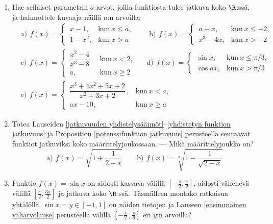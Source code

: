 \begin{enumerate}
\item
Hae sellaiset parametrin $a$ arvot, joilla funktiosta tulee jatkuva koko $\R$:ssä, ja
hahmottele kuvaaja näillä $a$:n arvoilla:
\begin{align*}
&\text{a)}\,\ f(x)=\begin{cases}
                   \,x-1, &\text{kun}\ x \le a, \\ \,1-x^2, &\text{kun}\ x>a
                   \end{cases} \qquad
 \text{b)}\,\ f(x)=\begin{cases}
                   \,a-x, &\text{kun}\ x \le -2, \\ \,x^3-4x, &\text{kun}\ x>-2
                   \end{cases} \\
&\text{c)}\,\ f(x)=\begin{cases}
                   \,\dfrac{x^2-4}{x^3-8}\,, &\text{kun}\ x<2, \\[2mm]\,a,&\text{kun}\ x \ge 2
                   \end{cases} \quad\ \
 \text{d)}\,\ f(x)=\begin{cases}
                   \,\sin x, &\text{kun}\ x \le \pi/3, \\ \,\cos ax, &\text{kun}\ x>\pi/3
                   \end{cases} \\
&\text{e)}\,\ f(x)=\begin{cases}
                   \,\dfrac{x^3+4x^2+5x+2}{x^2+3x+2}\,, &\text{kun}\ x<a, \\[2mm] 
                   \,ax-10,                             &\text{kun}\ x \ge a
                   \end{cases}
\end{align*}

\item
Totea Lauseiden \ref{jatkuvuuden yhdistelysäännöt}--\ref{yhdistetyn funktion jatkuvuus} ja 
Proposition \ref{potenssifunktion jatkuvuus} perusteella seuraavat funktiot jatkuviksi koko 
määrittelyjoukossaan. --- Mikä määrittelyjoukko on?
\[
\text{a)}\,\ f(x)=\sqrt{1+\frac{1}{2-x}} \qquad 
\text{b)}\,\ f(x)=\sqrt[4]{1-\frac{1}{\sqrt{2-x}}}
\]

\item
Funktio $f(x)=\sin x$ on aidosti kasvava välillä $[-\frac{\pi}{2},\frac{\pi}{2}]$, aidosti
vähenevä välillä $[\frac{\pi}{2},\frac{3\pi}{2}]$ ja jatkuva koko $\R$:ssä. Täsmälleen montako
ratkaisua yhtälöllä $\,\sin x=y\in[-1,1]$ on näiden tietojen ja Lauseen 
\ref{ensimmäinen väliarvolause} perusteella välillä $[-\frac{\pi}{2}\,,\frac{\pi}{6}]$ eri
$y$:n arvoilla?


\end{enumerate}

